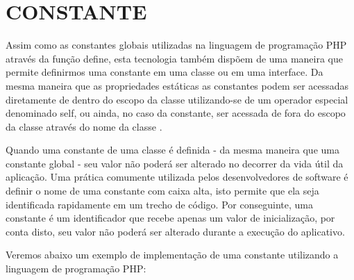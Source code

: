 \section{CONSTANTE}

Assim como as constantes globais utilizadas na linguagem de programação PHP 
através da função define, esta tecnologia também dispõem de uma maneira que 
permite definirmos uma constante em uma classe ou em uma interface. Da mesma 
maneira que as propriedades estáticas as constantes podem ser acessadas 
diretamente de dentro do escopo da classe utilizando-se de um operador especial 
denominado self, ou ainda, no caso da constante, ser acessada de fora do escopo 
da classe através do nome da classe \cite{programmingPhp}.

Quando uma constante de uma classe é definida - da mesma maneira que uma 
constante global -  seu valor não poderá ser alterado no decorrer da vida  útil
da aplicação. Uma prática comumente utilizada pelos desenvolvedores de software 
é definir o nome de uma constante com caixa alta, isto permite que ela seja 
identificada rapidamente em um trecho de código. Por conseguinte, uma constante 
é um identificador que recebe apenas um valor de inicialização, por conta disto,
seu valor não poderá ser alterado durante a execução do aplicativo.

Veremos abaixo um exemplo de implementação de uma constante utilizando a 
linguagem de programação PHP: